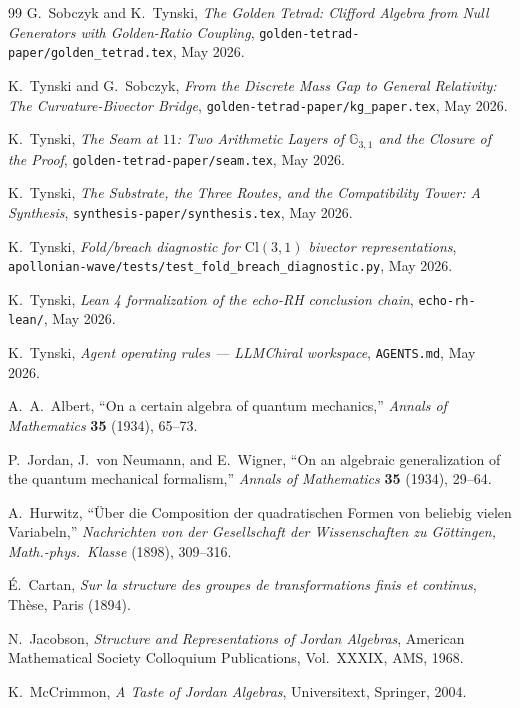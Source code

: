 \documentclass[11pt,a4paper]{article}
\theoremstyle{plain}
\theoremstyle{definition}
\theoremstyle{remark}
\numberwithin{equation}{section}
\providecommand{\Cl}{\mathrm{Cl}}
\providecommand{\GA}[2]{\mathbb{G}_{#1,#2}}
\begin{document}
\begin{thebibliography}{99}
G.~Sobczyk and K.~Tynski,
\emph{The Golden Tetrad: Clifford Algebra from Null Generators
with Golden-Ratio Coupling},
\texttt{golden-tetrad-paper/golden\_tetrad.tex}, May 2026.

K.~Tynski and G.~Sobczyk,
\emph{From the Discrete Mass Gap to General Relativity:
The Curvature-Bivector Bridge},
\texttt{golden-tetrad-paper/kg\_paper.tex}, May 2026.

K.~Tynski,
\emph{The Seam at $11$: Two Arithmetic Layers of $\GA{3}{1}$
and the Closure of the Proof},
\texttt{golden-tetrad-paper/seam.tex}, May 2026.

K.~Tynski,
\emph{The Substrate, the Three Routes, and the Compatibility
Tower: A Synthesis},
\texttt{synthesis-paper/synthesis.tex}, May 2026.

K.~Tynski, \emph{Fold/breach diagnostic for $\Cl(3,1)$ bivector
representations},
\texttt{apollonian-wave/tests/test\_fold\_breach\_diagnostic.py},
May 2026.

K.~Tynski,
\emph{Lean 4 formalization of the echo-RH conclusion chain},
\texttt{echo-rh-lean/}, May 2026.

K.~Tynski,
\emph{Agent operating rules --- LLMChiral workspace},
\texttt{AGENTS.md}, May 2026.

A.~A.~Albert,
``On a certain algebra of quantum mechanics,''
\emph{Annals of Mathematics} \textbf{35} (1934), 65--73.

P.~Jordan, J.~von Neumann, and E.~Wigner,
``On an algebraic generalization of the quantum mechanical
formalism,''
\emph{Annals of Mathematics} \textbf{35} (1934), 29--64.

A.~Hurwitz,
``\"Uber die Composition der quadratischen Formen von beliebig
vielen Variabeln,''
\emph{Nachrichten von der Gesellschaft der Wissenschaften zu
G\"ottingen, Math.-phys.\ Klasse} (1898), 309--316.

\'E.~Cartan,
\emph{Sur la structure des groupes de transformations finis et
continus}, Th\`ese, Paris (1894).

N.~Jacobson,
\emph{Structure and Representations of Jordan Algebras},
American Mathematical Society Colloquium Publications,
Vol.~XXXIX, AMS, 1968.

K.~McCrimmon,
\emph{A Taste of Jordan Algebras},
Universitext, Springer, 2004.


\end{thebibliography}
\end{document}
